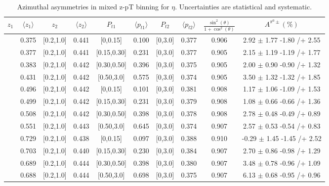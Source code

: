 \begin{table}[H]\scriptsize
\centering
\begin{tabular}{|c| c| c| c| c| c| c| c| c| c|}
\hline
$z_1$& $\langle  z_{1}  \rangle$ & $z_2$ & $\langle  z_{2}\rangle$& $P_{t1}$ & $\langle  p_{t1} \rangle$& $P_{t2}$ &  $\langle p_{t2}\rangle$ &$\frac{\sin^2(\theta)}{1+\cos^2(\theta)}$& $A^{\pi^0\pm}(\%)$   \\ \hline
[0.3,0.5]	&	0.375	&	[0.2,1.0]	&	0.441	&	[0,0.15]	&	0.100	&	[0,3.0]	&	0.377	&	0.906	&	2.92	$\pm$ 	1.77	-1.80	/+	2.55	\\ \hline
[0.3,0.5]	&	0.377	&	[0.2,1.0]	&	0.441	&	[0.15,0.30]	&	0.231	&	[0,3.0]	&	0.377	&	0.905	&	2.15	$\pm$ 	1.19	-1.19	/+	1.77	\\ \hline
[0.3,0.5]	&	0.383	&	[0.2,1.0]	&	0.442	&	[0.30,0.50]	&	0.396	&	[0,3.0]	&	0.375	&	0.905	&	2.00	$\pm$ 	0.90	-0.90	/+	1.32	\\ \hline
[0.3,0.5]	&	0.431	&	[0.2,1.0]	&	0.442	&	[0.50,3.0]	&	0.575	&	[0,3.0]	&	0.374	&	0.905	&	3.50	$\pm$ 	1.32	-1.32	/+	1.85	\\ \hline
[0.5,0.7]	&	0.496	&	[0.2,1.0]	&	0.442	&	[0,0.15]	&	0.101	&	[0,3.0]	&	0.381	&	0.908	&	1.17	$\pm$ 	1.06	-1.09	/+	1.53	\\ \hline
[0.5,0.7]	&	0.499	&	[0.2,1.0]	&	0.442	&	[0.15,0.30]	&	0.231	&	[0,3.0]	&	0.379	&	0.908	&	1.08	$\pm$ 	0.66	-0.66	/+	1.36	\\ \hline
[0.5,0.7]	&	0.508	&	[0.2,1.0]	&	0.442	&	[0.30,0.50]	&	0.398	&	[0,3.0]	&	0.378	&	0.908	&	2.78	$\pm$ 	0.48	-0.49	/+	0.89	\\ \hline
[0.5,0.7]	&	0.551	&	[0.2,1.0]	&	0.443	&	[0.50,3.0]	&	0.645	&	[0,3.0]	&	0.374	&	0.907	&	2.57	$\pm$ 	0.53	-0.54	/+	0.83	\\ \hline
[0.7,1.0]	&	0.729	&	[0.2,1.0]	&	0.438	&	[0,0.15]	&	0.097	&	[0,3.0]	&	0.388	&	0.910	&	-0.29	$\pm$ 	1.45	-1.45	/+	2.52	\\ \hline
[0.7,1.0]	&	0.703	&	[0.2,1.0]	&	0.440	&	[0.15,0.30]	&	0.230	&	[0,3.0]	&	0.384	&	0.907	&	2.70	$\pm$ 	0.86	-0.98	/+	1.29	\\ \hline
[0.7,1.0]	&	0.689	&	[0.2,1.0]	&	0.444	&	[0.30,0.50]	&	0.398	&	[0,3.0]	&	0.380	&	0.907	&	3.48	$\pm$ 	0.78	-0.96	/+	1.09	\\ \hline
[0.7,1.0]	&	0.688	&	[0.2,1.0]	&	0.444	&	[0.50,3.0]	&	0.698	&	[0,3.0]	&	0.375	&	0.907	&	6.13	$\pm$ 	0.68	-0.95	/+	0.96	\\ \hline
\end{tabular}
\caption{Azimuthal asymmetries in mixed z-pT binning for $\eta$. Uncertainties are statistical and systematic.}
\label{tab:finaletaptbins}
\end{table}

